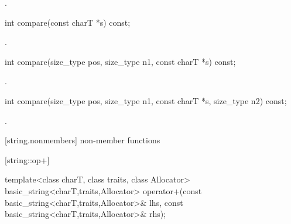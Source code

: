 \begin{itemdescr}
\pnum
\returns {}.
\end{itemdescr}

%
%
\begin{itemdecl}
int compare(const charT *s) const;
\end{itemdecl}

\begin{itemdescr}
\pnum
\returns
{}.
\end{itemdescr}

%
%
\begin{itemdecl}
int compare(size_type pos, size_type n1,
            const charT *s) const;
\end{itemdecl}

\begin{itemdescr}
\pnum
\returns {}.
\end{itemdescr}

%
%
\begin{itemdecl}
int compare(size_type pos, size_type n1,
            const charT *s, size_type n2) const;
\end{itemdecl}

\begin{itemdescr}
\pnum
\returns {}.
\end{itemdescr}

[string.nonmembers]{ non-member functions}


[string::op+]{}

%
%
\begin{itemdecl}
template<class charT, class traits, class Allocator>
  basic_string<charT,traits,Allocator>
    operator+(const basic_string<charT,traits,Allocator>& lhs,
              const basic_string<charT,traits,Allocator>& rhs);
\end{itemdecl}

